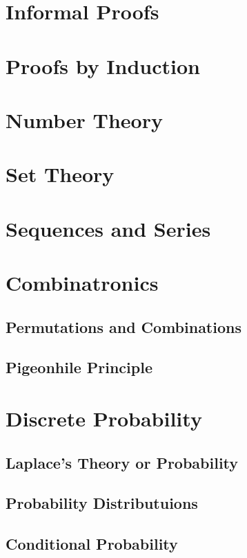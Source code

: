 \documentclass[a4paper]{article}
\begin{document}
\begin{multicols}{2}

	\section{Informal Proofs}

	\section{Proofs by Induction}

	\section{Number Theory}

	\section{Set Theory}

	\section{Sequences and Series}

	\section{Combinatronics}
	\subsection{Permutations and Combinations}
	\subsection{Pigeonhile Principle}

	\section{Discrete Probability}
	\subsection{Laplace's Theory or Probability}
	\subsection{Probability Distributuions}
	\subsection{Conditional Probability}

\end{multicols}
\end{document}
